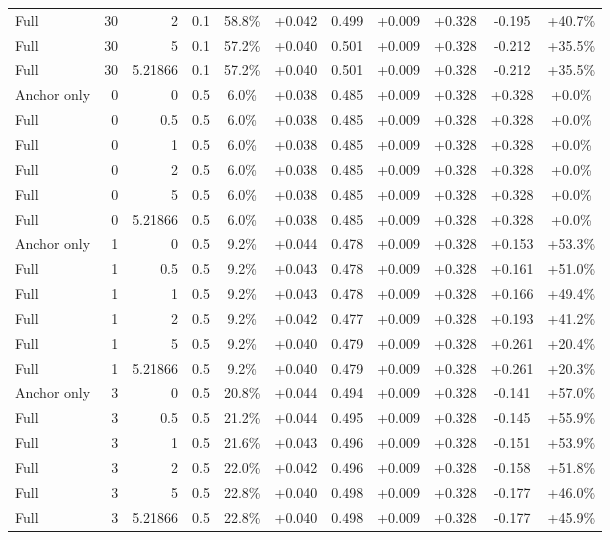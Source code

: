 \begin{table}[htbp]
\begin{tabular}{lrrrccccccc}
Full & 30 & 2 & 0.1 & 58.8\% & +0.042 & 0.499 & +0.009 & +0.328 & -0.195 & +40.7\% \\
Full & 30 & 5 & 0.1 & 57.2\% & +0.040 & 0.501 & +0.009 & +0.328 & -0.212 & +35.5\% \\
Full & 30 & 5.21866 & 0.1 & 57.2\% & +0.040 & 0.501 & +0.009 & +0.328 & -0.212 & +35.5\% \\
Anchor only & 0 & 0 & 0.5 & 6.0\% & +0.038 & 0.485 & +0.009 & +0.328 & +0.328 & +0.0\% \\
Full & 0 & 0.5 & 0.5 & 6.0\% & +0.038 & 0.485 & +0.009 & +0.328 & +0.328 & +0.0\% \\
Full & 0 & 1 & 0.5 & 6.0\% & +0.038 & 0.485 & +0.009 & +0.328 & +0.328 & +0.0\% \\
Full & 0 & 2 & 0.5 & 6.0\% & +0.038 & 0.485 & +0.009 & +0.328 & +0.328 & +0.0\% \\
Full & 0 & 5 & 0.5 & 6.0\% & +0.038 & 0.485 & +0.009 & +0.328 & +0.328 & +0.0\% \\
Full & 0 & 5.21866 & 0.5 & 6.0\% & +0.038 & 0.485 & +0.009 & +0.328 & +0.328 & +0.0\% \\
Anchor only & 1 & 0 & 0.5 & 9.2\% & +0.044 & 0.478 & +0.009 & +0.328 & +0.153 & +53.3\% \\
Full & 1 & 0.5 & 0.5 & 9.2\% & +0.043 & 0.478 & +0.009 & +0.328 & +0.161 & +51.0\% \\
Full & 1 & 1 & 0.5 & 9.2\% & +0.043 & 0.478 & +0.009 & +0.328 & +0.166 & +49.4\% \\
Full & 1 & 2 & 0.5 & 9.2\% & +0.042 & 0.477 & +0.009 & +0.328 & +0.193 & +41.2\% \\
Full & 1 & 5 & 0.5 & 9.2\% & +0.040 & 0.479 & +0.009 & +0.328 & +0.261 & +20.4\% \\
Full & 1 & 5.21866 & 0.5 & 9.2\% & +0.040 & 0.479 & +0.009 & +0.328 & +0.261 & +20.3\% \\
Anchor only & 3 & 0 & 0.5 & 20.8\% & +0.044 & 0.494 & +0.009 & +0.328 & -0.141 & +57.0\% \\
Full & 3 & 0.5 & 0.5 & 21.2\% & +0.044 & 0.495 & +0.009 & +0.328 & -0.145 & +55.9\% \\
Full & 3 & 1 & 0.5 & 21.6\% & +0.043 & 0.496 & +0.009 & +0.328 & -0.151 & +53.9\% \\
Full & 3 & 2 & 0.5 & 22.0\% & +0.042 & 0.496 & +0.009 & +0.328 & -0.158 & +51.8\% \\
Full & 3 & 5 & 0.5 & 22.8\% & +0.040 & 0.498 & +0.009 & +0.328 & -0.177 & +46.0\% \\
Full & 3 & 5.21866 & 0.5 & 22.8\% & +0.040 & 0.498 & +0.009 & +0.328 & -0.177 & +45.9\% \\

\end{tabular}
\end{table}
